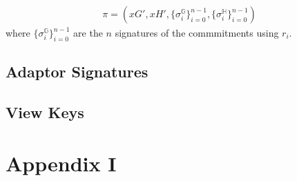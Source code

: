 \documentclass[runningheads]{llncs}
\newcommand{\ggroup}{\mathbb{G}}
\newcommand{\hgroup}{\mathbb{H}}
\begin{document}
\begin{align}
    \pi=(xG', xH', \{\sigma_i^{\ggroup}\}_{i=0}^{n-1}, \{\sigma_i^{\hgroup}\}_{i=0}^{n-1})
\end{align}
\noindent where $\{\sigma_i^{\ggroup}\}_{i=0}^{n-1}$ are the $n$ signatures of the commmitments using $r_i$.
\subsection{Adaptor Signatures}\label{sec_adaptorsignatures}
\subsection{View Keys}\label{sec_viewkeys}
%
%
%



\section*{Appendix I}\label{apx:I}

%
\end{document}
